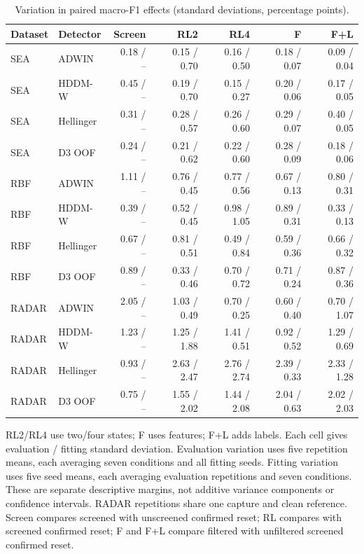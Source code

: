 \begin{table}[htbp]
\centering\small\singlespacing
\caption{Variation in paired macro-F1 effects (standard deviations, percentage points).}\label{tab:paired_variability}
\setlength{\tabcolsep}{4pt}
\renewcommand{\arraystretch}{1.15}
\begin{tabular}{@{}llrrrrr@{}}
\toprule
Dataset & Detector & Screen & RL2 & RL4 & F & F+L \\
\midrule
SEA & ADWIN & 0.18 / -- & 0.15 / 0.70 & 0.16 / 0.50 & 0.18 / 0.07 & 0.09 / 0.04 \\
SEA & HDDM-W & 0.45 / -- & 0.19 / 0.70 & 0.15 / 0.27 & 0.20 / 0.06 & 0.17 / 0.05 \\
SEA & Hellinger & 0.31 / -- & 0.28 / 0.57 & 0.26 / 0.60 & 0.29 / 0.07 & 0.40 / 0.05 \\
SEA & D3 OOF & 0.24 / -- & 0.21 / 0.62 & 0.22 / 0.60 & 0.28 / 0.09 & 0.18 / 0.06 \\
RBF & ADWIN & 1.11 / -- & 0.76 / 0.45 & 0.77 / 0.56 & 0.67 / 0.13 & 0.80 / 0.31 \\
RBF & HDDM-W & 0.39 / -- & 0.52 / 0.45 & 0.98 / 1.05 & 0.89 / 0.31 & 0.33 / 0.13 \\
RBF & Hellinger & 0.67 / -- & 0.81 / 0.51 & 0.49 / 0.84 & 0.59 / 0.36 & 0.66 / 0.32 \\
RBF & D3 OOF & 0.89 / -- & 0.33 / 0.46 & 0.70 / 0.72 & 0.71 / 0.24 & 0.87 / 0.36 \\
RADAR & ADWIN & 2.05 / -- & 1.03 / 0.49 & 0.70 / 0.25 & 0.60 / 0.40 & 0.70 / 1.07 \\
RADAR & HDDM-W & 1.23 / -- & 1.25 / 1.88 & 1.41 / 0.51 & 0.92 / 0.52 & 1.29 / 0.69 \\
RADAR & Hellinger & 0.93 / -- & 2.63 / 2.47 & 2.76 / 2.74 & 2.39 / 0.33 & 2.33 / 1.28 \\
RADAR & D3 OOF & 0.75 / -- & 1.55 / 2.02 & 1.44 / 2.08 & 2.04 / 0.63 & 2.02 / 2.03 \\
\bottomrule
\end{tabular}
\par\smallskip\begin{minipage}{\textwidth}\footnotesize RL2/RL4 use two/four states; F uses features; F+L adds labels. Each cell gives evaluation / fitting standard deviation. Evaluation variation uses five repetition means, each averaging seven conditions and all fitting seeds. Fitting variation uses five seed means, each averaging evaluation repetitions and seven conditions. These are separate descriptive margins, not additive variance components or confidence intervals. RADAR repetitions share one capture and clean reference. Screen compares screened with unscreened confirmed reset; RL compares with screened confirmed reset; F and F+L compare filtered with unfiltered screened confirmed reset.\end{minipage}
\end{table}
